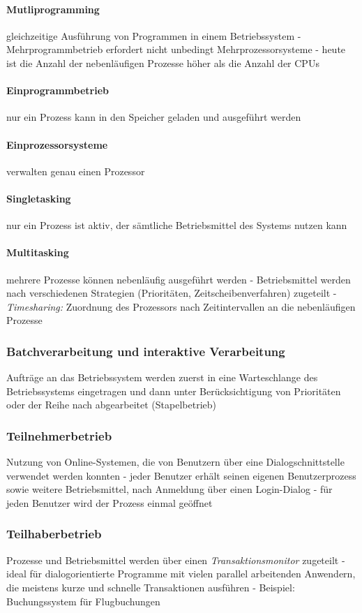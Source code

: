 \documentclass[11pt,a4paper,landscape]{article}
\begin{document}
\begin{multicols*}{3}
	\paragraph{Mutliprogramming} gleichzeitige Ausführung von Programmen in einem Betriebssystem - Mehrprogrammbetrieb erfordert nicht unbedingt Mehrprozessorsysteme - heute ist die Anzahl der nebenläufigen Prozesse höher als die Anzahl der CPUs
	\paragraph{Einprogrammbetrieb} nur ein Prozess kann in den Speicher geladen und ausgeführt werden
	\paragraph{Einprozessorsysteme} verwalten genau einen Prozessor
	\paragraph{Singletasking} nur ein Prozess ist aktiv, der sämtliche Betriebsmittel des Systems nutzen kann
	\paragraph{Multitasking} mehrere Prozesse können nebenläufig ausgeführt werden - Betriebsmittel werden nach verschiedenen Strategien (Prioritäten, Zeitscheibenverfahren) zugeteilt - \textit{Timesharing:} Zuordnung des Prozessors nach Zeitintervallen an die nebenläufigen Prozesse
	\subsubsection{Batchverarbeitung und interaktive Verarbeitung}
	Aufträge an das Betriebssystem werden zuerst in eine Warteschlange des Betriebssystems eingetragen und dann unter Berücksichtigung von Prioritäten oder der Reihe nach abgearbeitet (Stapelbetrieb)
	\subsubsection{Teilnehmerbetrieb}
	Nutzung von Online-Systemen, die von Benutzern über eine Dialogschnittstelle verwendet werden konnten - jeder Benutzer erhält seinen eigenen Benutzerprozess sowie weitere Betriebsmittel, nach Anmeldung über einen Login-Dialog - für jeden Benutzer wird der Prozess einmal geöffnet
	\subsubsection{Teilhaberbetrieb}
	Prozesse und Betriebsmittel werden über einen \textit{Transaktionsmonitor} zugeteilt - ideal für dialogorientierte Programme mit vielen parallel arbeitenden Anwendern, die meistens kurze und schnelle Transaktionen ausführen - Beispiel: Buchungssystem für Flugbuchungen

\end{multicols*}
\end{document}
